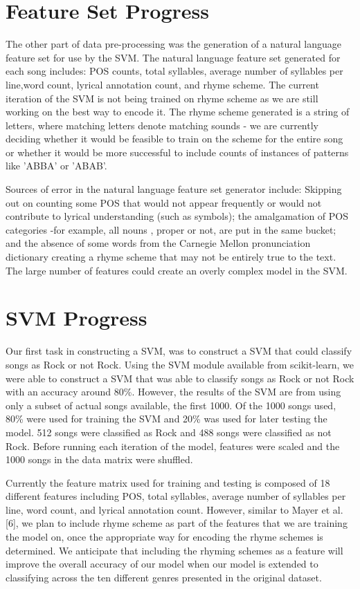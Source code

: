 \documentclass[journal]{IEEEtran}
\begin{document}
\section{Feature Set Progress}

The other part of data pre-processing was the generation of a natural language feature set for use by the SVM. The natural language feature set generated for each song  includes: POS counts, total syllables, average number of syllables per line,word count, lyrical annotation count, and rhyme scheme. The current iteration of the SVM is not being trained on rhyme scheme as we are still working on the best way to encode it. The rhyme scheme generated is a string of letters, where matching letters denote matching sounds - we are currently deciding whether it would be feasible to train on the scheme for the entire song or whether it would be more successful to include counts of instances of patterns like 'ABBA' or 'ABAB'.

Sources of error in the natural language feature set generator include: Skipping out on counting some POS that would not appear frequently or would not contribute to lyrical understanding (such as symbols); the amalgamation of POS categories -for example, all nouns , proper or not, are put in the same bucket; and the absence of some words from the Carnegie Mellon pronunciation dictionary creating a rhyme scheme that may not be entirely true to the text. The large number of features could create an overly complex model in the SVM.

\section{SVM Progress}

Our first task in constructing a SVM, was to construct a SVM that could classify songs as Rock or not Rock. Using the SVM module available from scikit-learn, we were able to construct a SVM that was able to classify songs as Rock or not Rock with an accuracy around 80\%. However, the results of the SVM are from using only a subset of actual songs available, the first 1000. Of the 1000 songs used, 80\% were used for training the SVM and 20\% was used for later testing the model. 512 songs were classified as Rock and 488 songs were classified as not Rock. Before running each iteration of the model, features were scaled and the 1000 songs in the data matrix were shuffled.

Currently the feature matrix used for training and testing is composed of 18 different features including POS, total syllables, average number of syllables per line, word count, and lyrical annotation count. However, similar to Mayer et al. [6], we plan to include rhyme scheme as part of the features that we are training the model on, once the appropriate way for encoding the rhyme schemes is determined. We anticipate that including the rhyming schemes as a feature will improve the overall accuracy of our model when our model is extended to classifying across the ten different genres presented in the original dataset.
\end{document}
